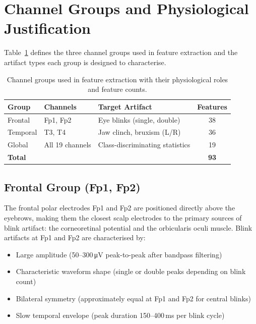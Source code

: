 \section{Channel Groups and Physiological Justification}
\label{sec:fe_groups}

Table~\ref{tab:channel_groups} defines the three channel
groups used in feature extraction and the artifact types
each group is designed to characterise.

\begin{table}[htbp]
\centering
\caption{Channel groups used in feature extraction with their
physiological roles and feature counts.}
\label{tab:channel_groups}
\renewcommand{\arraystretch}{1.3}
\begin{tabular}{p{2.2cm} p{2.5cm} p{3.5cm} c}
\toprule
\textbf{Group} & \textbf{Channels} & \textbf{Target Artifact} &
\textbf{Features} \\
\midrule
Frontal  & Fp1, Fp2            & Eye blinks (single, double) & 38 \\
Temporal & T3, T4              & Jaw clinch, bruxism (L/R) & 36 \\
Global   & All 19 channels     & Class-discriminating statistics & 19 \\
\midrule
\textbf{Total} & & & \textbf{93} \\
\bottomrule
\end{tabular}
\end{table}

\subsection{Frontal Group (Fp1, Fp2)}

The frontal polar electrodes Fp1 and Fp2 are positioned
directly above the eyebrows, making them the closest scalp
electrodes to the primary sources of blink artifact: the
corneoretinal potential and the orbicularis oculi muscle.
Blink artifacts at Fp1 and Fp2 are characterised by:

\begin{itemize}[leftmargin=*]
    \item Large amplitude (50--300\,\si{\micro\volt}
    peak-to-peak after bandpass filtering)
    \item Characteristic waveform shape (single or double
    peaks depending on blink count)
    \item Bilateral symmetry (approximately equal at Fp1
    and Fp2 for central blinks)
    \item Slow temporal envelope (peak duration 150--400\,ms
    per blink cycle)
\end{itemize}

